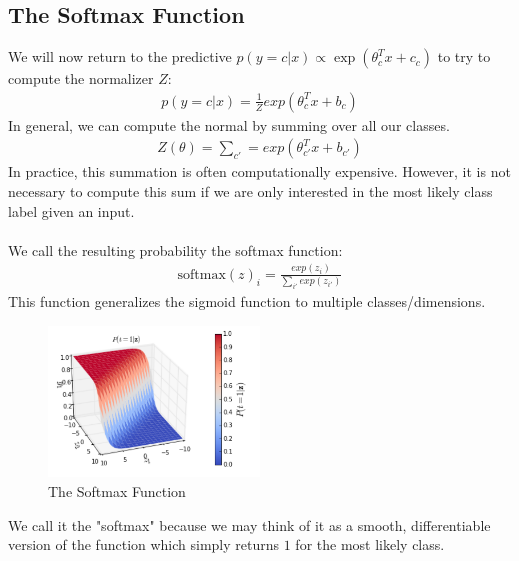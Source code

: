 \documentclass{article}
\begin{document}
\subsection{The Softmax Function}
We will now return to the predictive $p(y = c | x) \propto \exp(\theta_c^T x + c_c)$ to try to compute the normalizer $Z$: 
\begin{align}
    p(y=c|x) = \frac{1}{Z} exp(\theta_c^T x + b_c)
\end{align}
In general, we can compute the normal by summing over all our classes.
\begin{align}
    Z(\theta) = \sum_{c'} = exp(\theta_{c'}^T x + b_{c'})
\end{align}
In practice, this summation is often computationally expensive. However, it is not necessary to compute this sum if we are only interested in the most likely class label given an input.  \\ \\ 
We call the resulting probability the softmax function: 
\begin{align} 
    \text{softmax}(z)_i = \frac{ exp(z_i) }{ \sum_{i'} exp(z_{i'}) }
\end{align}
This function generalizes the sigmoid function to multiple classes/dimensions. 
\begin{figure}
\centering
\includegraphics[width=0.5\textwidth]{./softmax.png}
\caption{The Softmax Function}
\end{figure}
We call it the "softmax" because we may think of it as a smooth, differentiable version of the function which simply returns $1$ for the most likely class. 
\end{document}
